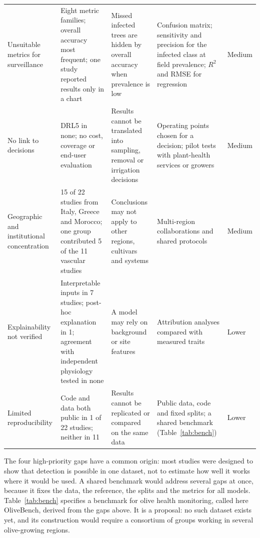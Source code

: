 \documentclass[preprint,12pt]{elsarticle}
\begin{document}
\begin{landscape}
\begin{longtable}{@{}L{3.22cm}L{4.48cm}L{4.29cm}L{5.07cm}L{1.17cm}@{}}
Unsuitable metrics for surveillance & Eight metric families; overall accuracy most frequent; one study reported results only in a chart & Missed infected trees are hidden by overall accuracy when prevalence is low & Confusion matrix; sensitivity and precision for the infected class at field prevalence; $R^2$ and RMSE for regression & Medium\\[2pt]
No link to decisions & DRL5 in none; no cost, coverage or end-user evaluation & Results cannot be translated into sampling, removal or irrigation decisions & Operating points chosen for a decision; pilot tests with plant-health services or growers & Medium\\[2pt]
Geographic and institutional concentration & 15 of 22 studies from Italy, Greece and Morocco; one group contributed 5 of the 11 vascular studies & Conclusions may not apply to other regions, cultivars and systems & Multi-region collaborations and shared protocols & Medium\\[2pt]
Explainability not verified & Interpretable inputs in 7 studies; post-hoc explanation in 1; agreement with independent physiology tested in none & A model may rely on background or site features & Attribution analyses compared with measured traits & Lower\\[2pt]
Limited reproducibility & Code and data both public in 1 of 22 studies; neither in 11 & Results cannot be replicated or compared on the same data & Public data, code and fixed splits; a shared benchmark (Table~\ref{tab:bench}) & Lower\\
\end{longtable}
\end{landscape}

The four high-priority gaps have a common origin: most studies were designed to show that detection is possible in one dataset, not to estimate how well it works where it would be used. A shared benchmark would address several gaps at once, because it fixes the data, the reference, the splits and the metrics for all models. Table~\ref{tab:bench} specifies a benchmark for olive health monitoring, called here OliveBench, derived from the gaps above. It is a proposal: no such dataset exists yet, and its construction would require a consortium of groups working in several olive-growing regions.
\end{document}
